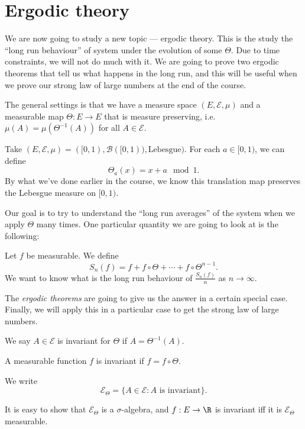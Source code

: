 \documentclass[a4paper]{article}
\begin{document}
\section{Ergodic theory}
We are now going to study a new topic --- ergodic theory. This is the study the ``long run behaviour'' of system under the evolution of some $\Theta$. Due to time constraints, we will not do much with it. We are going to prove two ergodic theorems that tell us what happens in the long run, and this will be useful when we prove our strong law of large numbers at the end of the course.

The general settings is that we have a measure space $(E, \mathcal{E}, \mu)$ and a measurable map $\Theta: E \to E$ that is measure preserving, i.e.\ $\mu(A) = \mu(\Theta^{-1}(A))$ for all $A \in \mathcal{E}$.

\begin{eg}
  Take $(E, \mathcal{E}, \mu) = ([0, 1), \mathcal{B}([0, 1)), \mathrm{Lebesgue})$. For each $a \in [0, 1)$, we can define
  \[
    \Theta_a (x) = x + a \mod 1.
  \]
  By what we've done earlier in the course, we know this translation map preserves the Lebesgue measure on $[0, 1)$.
\end{eg}

Our goal is to try to understand the ``long run averages'' of the system when we apply $\Theta$ many times. One particular quantity we are going to look at is the following:

Let $f$ be measurable. We define
\[
  S_n(f) = f + f \circ \Theta + \cdots + f \circ \Theta^{n - 1}.
\]
We want to know what is the long run behaviour of $\frac{S_n(f)}{n}$ as $n \to \infty$.

The \emph{ergodic theorems} are going to give us the answer in a certain special case. Finally, we will apply this in a particular case to get the strong law of large numbers.

\begin{defi}
  We say $A \in \mathcal{E}$ is invariant for $\Theta$ if $A = \Theta^{-1}(A)$.
\end{defi}

\begin{defi}
  A measurable function $f$ is invariant if $f = f \circ \Theta$.
\end{defi}

\begin{defi}
  We write
  \[
    \mathcal{E}_\Theta = \{A \in \mathcal{E}: A\text{ is invariant}\}.
  \]
\end{defi}
It is easy to show that $\mathcal{E}_\Theta$ is a $\sigma$-algebra, and $f: E \to \R$ is invariant iff it is $\mathcal{E}_\Theta$ measurable.
\end{document}
